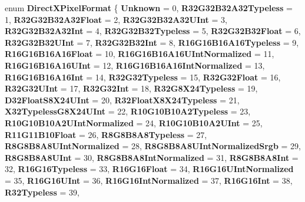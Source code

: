 \begin{DoxyCompactItemize}
\item 
\mbox{\label{namespace_windows_1_1_graphics_1_1_direct_x_a842a48af0a06e5cee12c38f8c99fbdce}} 
enum {\bfseries Direct\+X\+Pixel\+Format} \{ \newline
{\bfseries Unknown} = 0, 
{\bfseries R32\+G32\+B32\+A32\+Typeless} = 1, 
{\bfseries R32\+G32\+B32\+A32\+Float} = 2, 
{\bfseries R32\+G32\+B32\+A32\+U\+Int} = 3, 
\newline
{\bfseries R32\+G32\+B32\+A32\+Int} = 4, 
{\bfseries R32\+G32\+B32\+Typeless} = 5, 
{\bfseries R32\+G32\+B32\+Float} = 6, 
{\bfseries R32\+G32\+B32\+U\+Int} = 7, 
\newline
{\bfseries R32\+G32\+B32\+Int} = 8, 
{\bfseries R16\+G16\+B16\+A16\+Typeless} = 9, 
{\bfseries R16\+G16\+B16\+A16\+Float} = 10, 
{\bfseries R16\+G16\+B16\+A16\+U\+Int\+Normalized} = 11, 
\newline
{\bfseries R16\+G16\+B16\+A16\+U\+Int} = 12, 
{\bfseries R16\+G16\+B16\+A16\+Int\+Normalized} = 13, 
{\bfseries R16\+G16\+B16\+A16\+Int} = 14, 
{\bfseries R32\+G32\+Typeless} = 15, 
\newline
{\bfseries R32\+G32\+Float} = 16, 
{\bfseries R32\+G32\+U\+Int} = 17, 
{\bfseries R32\+G32\+Int} = 18, 
{\bfseries R32\+G8\+X24\+Typeless} = 19, 
\newline
{\bfseries D32\+Float\+S8\+X24\+U\+Int} = 20, 
{\bfseries R32\+Float\+X8\+X24\+Typeless} = 21, 
{\bfseries X32\+Typeless\+G8\+X24\+U\+Int} = 22, 
{\bfseries R10\+G10\+B10\+A2\+Typeless} = 23, 
\newline
{\bfseries R10\+G10\+B10\+A2\+U\+Int\+Normalized} = 24, 
{\bfseries R10\+G10\+B10\+A2\+U\+Int} = 25, 
{\bfseries R11\+G11\+B10\+Float} = 26, 
{\bfseries R8\+G8\+B8\+A8\+Typeless} = 27, 
\newline
{\bfseries R8\+G8\+B8\+A8\+U\+Int\+Normalized} = 28, 
{\bfseries R8\+G8\+B8\+A8\+U\+Int\+Normalized\+Srgb} = 29, 
{\bfseries R8\+G8\+B8\+A8\+U\+Int} = 30, 
{\bfseries R8\+G8\+B8\+A8\+Int\+Normalized} = 31, 
\newline
{\bfseries R8\+G8\+B8\+A8\+Int} = 32, 
{\bfseries R16\+G16\+Typeless} = 33, 
{\bfseries R16\+G16\+Float} = 34, 
{\bfseries R16\+G16\+U\+Int\+Normalized} = 35, 
\newline
{\bfseries R16\+G16\+U\+Int} = 36, 
{\bfseries R16\+G16\+Int\+Normalized} = 37, 
{\bfseries R16\+G16\+Int} = 38, 
{\bfseries R32\+Typeless} = 39, 
\newline

\end{DoxyCompactItemize}
